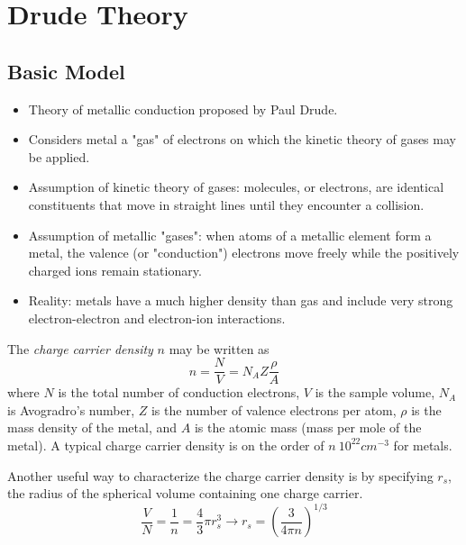\documentclass[10pt]{article}
\begin{document}
\maketitle

\section{Drude Theory}
\subsection{Basic Model}
\begin{itemize}
  \item Theory of metallic conduction proposed by Paul Drude.
  \item Considers metal a "gas" of electrons on which the kinetic theory of gases may be applied.
  \item Assumption of kinetic theory of gases: molecules, or electrons, are identical constituents that move
  in straight lines until they encounter a collision.
  \item Assumption of metallic "gases": when atoms of a metallic element form a metal, the valence (or "conduction")
  electrons move freely while the positively charged ions remain stationary.
  \item Reality: metals have a much higher density than gas and include very strong electron-electron and electron-ion
  interactions.

\end{itemize}

The \emph{charge carrier density} $n$ may be written as
$$
n = \frac{N}{V} = N_{A}Z\frac{\rho}{A}
$$
where $N$ is the total number of conduction electrons, $V$ is the sample volume, $N_{A}$ is Avogradro's number,
$Z$ is the number of valence electrons per atom, $\rho$ is the mass density of the metal, and $A$ is the atomic mass (mass per mole of
the metal). A typical charge carrier density is on the order of $n ~ 10^{22} cm^{-3}$ for metals.

Another useful way to characterize the charge carrier density is by specifying $r_{s}$, the radius of the spherical volume containing
one charge carrier.
$$
\frac{V}{N} = \frac{1}{n} = \frac{4}{3}\pi r_{s}^{3} \rightarrow r_{s} = (\frac{3}{4\pi n})^{1/3}
$$
\end{document}
